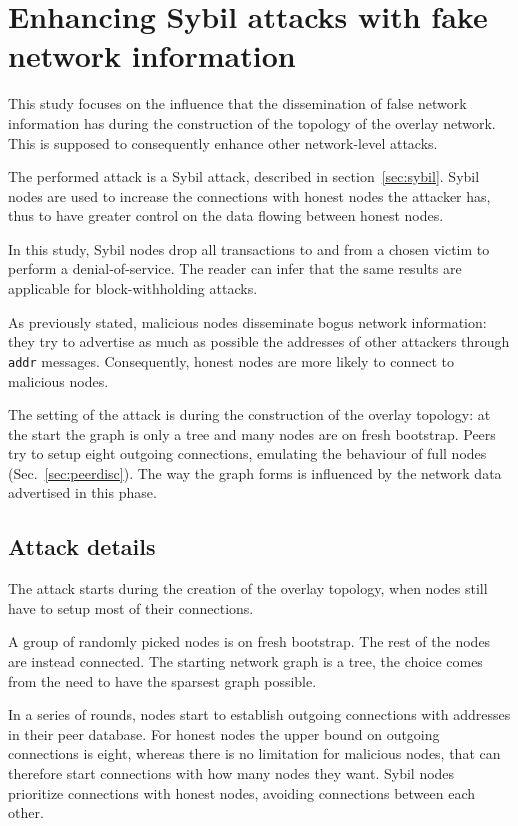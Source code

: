 \chapter{Enhancing Sybil attacks with fake network information}
\label{sec:atk}
This study focuses on the influence that the dissemination of false network information has during the construction of the topology of the overlay network. This is supposed to consequently enhance other network-level attacks.

The performed attack is a Sybil attack, described in section~\ref{sec:sybil}. Sybil nodes are used to increase the connections with honest nodes the attacker has, thus to have greater control on the data flowing between honest nodes.  

In this study, Sybil nodes drop all transactions to and from a chosen victim to perform a denial-of-service. The reader can infer that the same results are applicable for block-withholding attacks.

As previously stated, malicious nodes disseminate bogus network information: they try to advertise as much as possible the addresses of other attackers through \texttt{addr} messages. Consequently, honest nodes are more likely to connect to malicious nodes.

The setting of the attack is during the construction of the overlay topology: at the start the graph is only a tree and many nodes are on fresh bootstrap. Peers try to setup eight outgoing connections, emulating the behaviour of full nodes (Sec.~\ref{sec:peerdisc}). The way the graph forms is influenced by the network data advertised in this phase.

\section{Attack details}\label{sec:atkdetails}
The attack starts during the creation of the overlay topology, when nodes still have to setup most of their connections.

A group of randomly picked nodes is on fresh bootstrap. The rest of the nodes are instead connected. The starting network graph is a tree, the choice comes from the need to have the sparsest graph possible.

In a series of rounds, nodes start to establish outgoing connections with addresses in their peer database. For honest nodes the upper bound on outgoing connections is eight, whereas there is no limitation for malicious nodes, that can therefore start connections with how many nodes they want. Sybil nodes prioritize connections with honest nodes, avoiding connections between each other.

